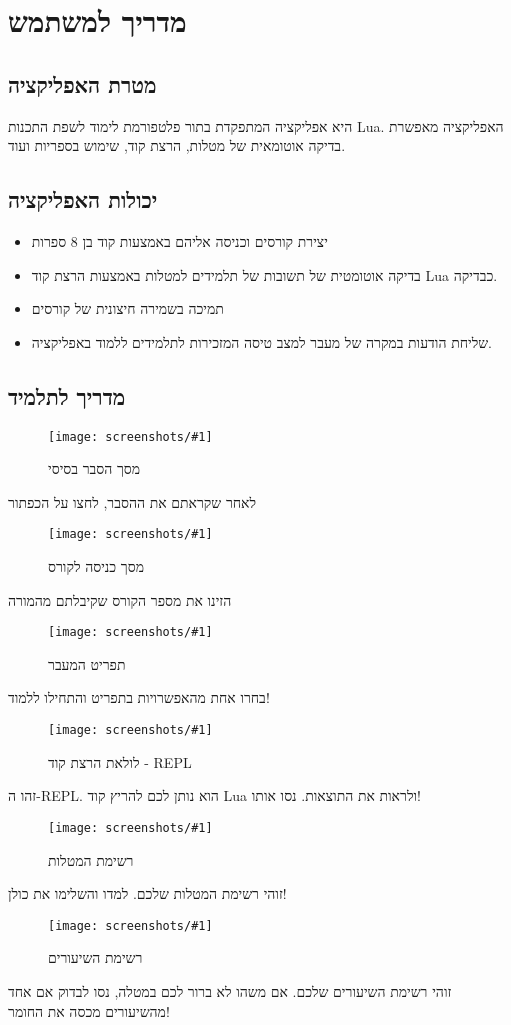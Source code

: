 \chapter{מדריך למשתמש}
\section{מטרת האפליקציה}

\projectname היא אפליקציה המתפקדת בתור פלטפורמת לימוד לשפת התכנות Lua.
האפליקציה מאפשרת בדיקה אוטומאית של מטלות, הרצת קוד, שימוש בספריות ועוד.

\section{יכולות האפליקציה}

\begin{itemize}

\item יצירת קורסים וכניסה אליהם באמצעות קוד בן 8 ספרות
\item בדיקה אוטומטית של תשובות של תלמידים למטלות באמצעות הרצת קוד Lua כבדיקה.
\item תמיכה בשמירה חיצונית של קורסים
\item שליחת הודעות במקרה של מעבר למצב טיסה המזכירות לתלמידים ללמוד באפליקציה.

\end{itemize}

\section{מדריך לתלמיד}

\newcommand{\screen}[3]{
  \begin{minipage}{0.45\linewidth}
    \begin{figure}[H]
        \centering
        \caption{#2}
        \texttt{[image: screenshots/\#1]}
    \end{figure}
    #3
  \end{minipage}
}

\screen{splash}{מסך הסבר בסיסי}{לאחר שקראתם את ההסבר, לחצו על הכפתור}
\hfill
\screen{firsttime}{מסך כניסה לקורס}{הזינו את מספר הקורס שקיבלתם מהמורה}

\screen{drawer}{תפריט המעבר}{בחרו אחת מהאפשרויות בתפריט והתחילו ללמוד!}
\hfill
\screen{repl}{לולאת הרצת קוד - REPL}{זהו ה-REPL. הוא נותן לכם להריץ קוד Lua ולראות את התוצאות. נסו אותו!}

\screen{exerciselist}{רשימת המטלות}{זוהי רשימת המטלות שלכם. למדו והשלימו את כולן!}
\hfill
\screen{articlelist}{רשימת השיעורים}{זוהי רשימת השיעורים שלכם. אם משהו לא ברור לכם במטלה, נסו לבדוק אם אחד מהשיעורים מכסה את החומר!}

